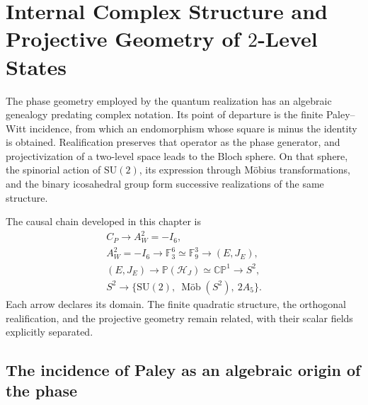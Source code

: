 \chapter{Internal Complex Structure and Projective Geometry of \(2\)-Level States}
\label{chap:geometria-proyectiva-bloch}

The phase geometry employed by the quantum realization has an algebraic genealogy predating complex notation. Its point of departure is the finite Paley--Witt incidence, from which an endomorphism whose square is minus the identity is obtained. Realification preserves that operator as the phase generator, and projectivization of a two-level space leads to the Bloch sphere. On that sphere, the spinorial action of \(\mathrm{SU}(2)\), its expression through Möbius transformations, and the binary icosahedral group form successive realizations of the same structure.

The causal chain developed in this chapter is
\begin{equation}
 \boxed{
 \begin{gathered}
 C_P\longrightarrow A_W^2=-I_6,\\
 A_W^2=-I_6\longrightarrow
 \mathbb F_3^6\simeq\mathbb F_9^3
 \longrightarrow (E,J_E),\\
 (E,J_E)\longrightarrow
 \mathbb P(\mathcal H_J)\simeq\mathbb{CP}^{1}
 \longrightarrow S^2,\\
 S^2\longrightarrow
 \bigl\{\mathrm{SU}(2),\ \mathop{\text{M\"ob}}(S^2),\ 2A_5\bigr\}.
 \end{gathered}}
 \label{eq:cadena-paley-bloch-anexo}
\end{equation}
Each arrow declares its domain. The finite quadratic structure, the
orthogonal realification, and the projective geometry remain related, with
their scalar fields explicitly separated.

\section{The incidence of Paley as an algebraic origin of the phase}

